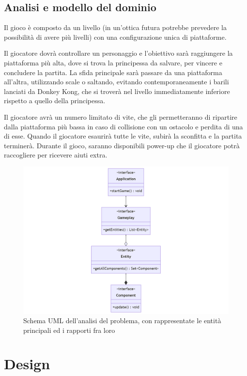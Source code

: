 \documentclass[a4paper,12pt]{report}
\begin{document}
\section{Analisi e modello del dominio}

Il gioco è composto da un livello (in un'ottica futura potrebbe prevedere la possibilità di avere più livelli) con una configurazione unica di piattaforme.

Il giocatore dovrà controllare un personaggio e l'obiettivo sarà raggiungere la piattaforma più alta, dove si trova la principessa da salvare, per vincere e concludere la partita. La sfida principale sarà passare da una piattaforma all'altra, utilizzando scale o saltando, evitando contemporaneamente i barili lanciati da Donkey Kong, che si troverà nel livello immediatamente inferiore rispetto a quello della principessa.

Il giocatore avrà un numero limitato di vite, che gli permetteranno di ripartire dalla piattaforma più bassa in caso di collisione con un ostacolo e perdita di una di esse. Quando il giocatore esaurirà tutte le vite, subirà la sconfitta e la partita terminerà. Durante il gioco, saranno disponibili power-up che il giocatore potrà raccogliere per ricevere aiuti extra.

\begin{figure}[H]
\includegraphics[width=1\textwidth]{img/analisi.png}
\centering{}
\caption{Schema UML dell'analisi del problema, con rappresentate le entità principali ed i rapporti fra loro}
\label{img:analisi}
\end{figure}

\chapter{Design}
\end{document}
